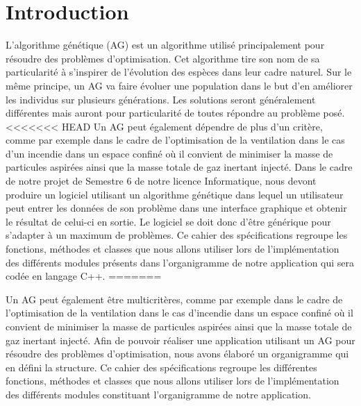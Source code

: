 \documentclass[a4paper,11pt]{article}
\title{\vspace{13em}{\huge Cahier des Spécifications}}
\author{Edouard Fouassier - Maxime Gonthier - Benjamin Guillot\\
		Laureline Martin - Rémi Navarro - Lydia Rodrigez de la Nava
		\vspace{2em}\\
		Algorithme Génétique
		\vspace{2em}}
\begin{document}
	
	\clearpage
	\maketitle\vspace{13em}
\newpage
\tableofcontents
\newpage\clearpage{}
	
	\section{Introduction}
		L’algorithme génétique (AG) est un algorithme utilisé principalement pour résoudre des problèmes d’optimisation. 
		Cet algorithme tire son nom de sa particularité à s’inspirer de l’évolution des espèces dans leur cadre naturel.
		Sur le même principe, un AG va faire évoluer une population dans le but d’en améliorer les individus sur plusieurs générations.
		Les solutions seront généralement différentes mais auront pour particularité de toutes répondre au problème posé.
<<<<<<< HEAD
		Un AG peut également dépendre de plus d'un critère, comme par exemple dans le cadre de l'optimisation de la ventilation dans le cas d’un incendie dans un espace confiné où il convient de minimiser la masse de particules aspirées ainsi que la masse totale de gaz inertant injecté.
		Dans le cadre de notre projet de Semestre 6 de notre licence Informatique, nous devont produire un logiciel utilisant un algorithme génétique dans lequel un utilisateur peut entrer les données de son problème dans une interface graphique et obtenir le résultat de celui-ci en sortie. Le logiciel se doit donc d'être générique pour s'adapter à un maximum de problèmes.
		Ce cahier des spécifications regroupe les fonctions, méthodes et classes que nous allons utiliser lors de l’implémentation des différents modules présents dans l'organigramme de notre application qui sera codée en langage C++.
=======

		Un AG peut également être multicritères, comme par exemple dans le cadre de l'optimisation de la ventilation dans le cas d’incendie dans un espace confiné où il convient de minimiser la masse de particules aspirées ainsi que la masse totale de gaz inertant injecté.
		Afin de pouvoir réaliser une application utilisant un AG pour résoudre des problèmes d’optimisation, nous avons élaboré un organigramme qui en défini la structure. 
		Ce cahier des spécifications regroupe les différentes fonctions, méthodes et classes que nous allons utiliser lors de l’implémentation des différents modules constituant l'organigramme de notre application.
\end{document}

